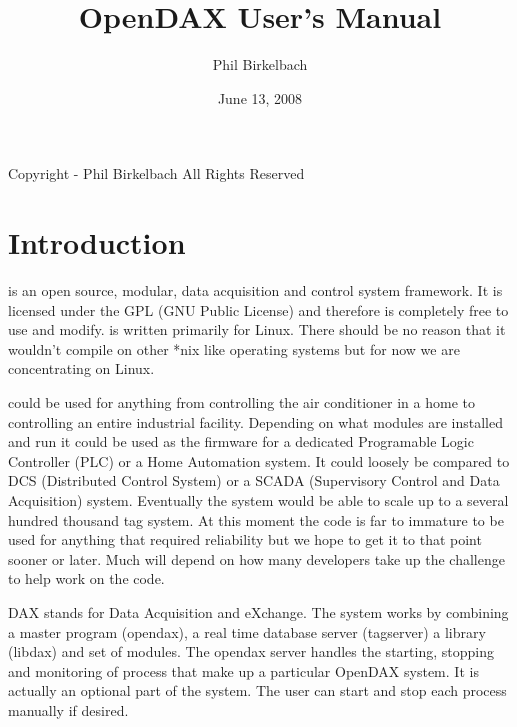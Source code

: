 

\title{OpenDAX User's Manual}
\date{June 13, 2008}
\author{Phil Birkelbach}



	\maketitle

	\begin{flushleft}
		Copyright  - Phil Birkelbach\linebreak
		All Rights Reserved
	\end{flushleft}

	\tableofcontents
	\newpage
	\chapter{Introduction}
	\opendax{} is an open source, modular, data acquisition and control system
	framework. It is licensed under the GPL (GNU Public License) and therefore is
	completely free to use and modify. \opendax{} is written primarily for Linux.
	There should be no reason that it wouldn't compile on other *nix like operating
	systems but for now we are concentrating on Linux.

	\opendax{} could be used for anything from controlling the air conditioner in a
	home to controlling an entire industrial facility. Depending on what modules are
	installed and run it could be used as the firmware for a dedicated Programable
	Logic Controller (PLC) or a Home Automation system. It could loosely be compared
	to DCS (Distributed Control System) or a SCADA (Supervisory Control and Data
	Acquisition) system. Eventually the system would be able to scale up to a
	several hundred thousand tag system. At this moment the code is far to immature
	to be used for anything that required reliability but we hope to get it to that
	point sooner or later. Much will depend on how many developers take up the
	challenge to help work on the code.

	DAX stands for Data Acquisition and eXchange. The system works by combining a
	master program (opendax), a real time database server (tagserver) a library
	(libdax) and set of modules. The opendax server handles the starting, stopping
	and monitoring of process that make up a particular OpenDAX system.  It is
	actually an optional part of the system.  The user can start and stop each
	process manually if desired.

